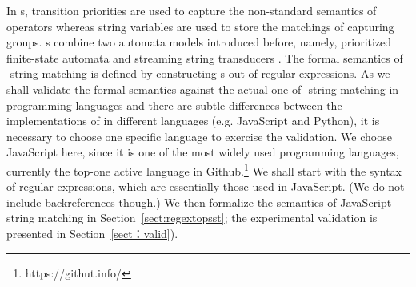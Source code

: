 {	In {\PSST}s, transition priorities are used to capture the non-standard semantics of {\regexp} operators whereas string variables are used to store the matchings of capturing groups. {\PSST}s combine two automata models introduced before, namely, prioritized finite-state automata \cite{BM17} and streaming string transducers \cite{AC10,AD11}. The formal semantics of {\regexp}-string matching is defined by constructing {\PSST}s out of regular expressions. 
	As we shall validate the formal semantics against the actual one of {\regexp}-string matching in programming languages and there are subtle differences between the implementations of {\regexp} in different languages (e.g. JavaScript and Python), it is necessary to choose one specific language to exercise the validation. We choose JavaScript here, since it is one of the most widely used programming languages,  currently the top-one active language in Github.\footnote{https://githut.info/}
	We shall start with the syntax of regular expressions, which are essentially those used in JavaScript. (We do not include backreferences though.) We then formalize the semantics of JavaScript \regexp-string matching in Section~\ref{sect:regextopsst}; the experimental validation is presented in 
	Section~\ref{sect：valid}).
	
}
